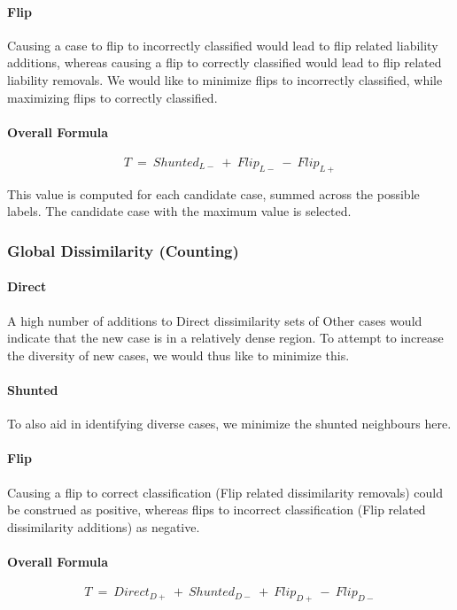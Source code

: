 \documentclass[a4paper,11pt]{report}
\begin{document}
\paragraph{Flip}
Causing a case to flip to incorrectly classified would lead to flip related liability additions, whereas causing a flip to correctly classified would lead to flip related liability removals. We would like to minimize flips to incorrectly classified, while maximizing flips to correctly classified.

\paragraph{Overall Formula}
\[  
  T~=~Shunted_{L-}~+~Flip_{L-}~-~Flip_{L+}
\]

This value is computed for each candidate case, summed across the possible labels. The candidate case with the maximum value is selected.

\subsubsection{Global Dissimilarity (Counting)}

\paragraph{Direct}
A high number of additions to Direct dissimilarity sets of Other cases would indicate that the new case is in a relatively dense region. To attempt to increase the diversity of new cases, we would thus like to minimize this.

\paragraph{Shunted}
To also aid in identifying diverse cases, we minimize the shunted neighbours here.

\paragraph{Flip}
Causing a flip to correct classification (Flip related dissimilarity removals) could be construed as positive, whereas flips to incorrect classification (Flip related dissimilarity additions) as negative.

\paragraph{Overall Formula}
\[  
  T~=~Direct_{D+}~+~Shunted_{D-}~+~Flip_{D+}~-~Flip_{D-}
\]
\end{document}
